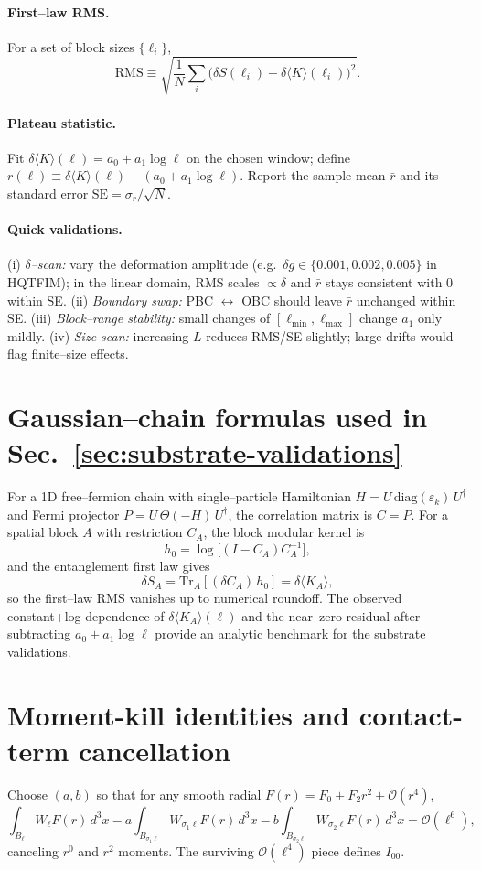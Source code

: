 \documentclass[aps,prd,onecolumn,superscriptaddress,nofootinbib]{revtex4-2}
\begin{document}
\paragraph*{First–law RMS.}
For a set of block sizes $\{\ell_i\}$,
\[
\mathrm{RMS} \equiv \sqrt{\frac{1}{N}\sum_i \big(\delta S(\ell_i)-\delta\!\langle K\rangle(\ell_i)\big)^2}.
\]
\paragraph*{Plateau statistic.}
Fit $\delta\!\langle K\rangle(\ell)=a_0+a_1\log\ell$ on the chosen window; define $r(\ell)\equiv\delta\!\langle K\rangle(\ell)-(a_0+a_1\log\ell)$. Report the sample mean $\bar r$ and its standard error $\mathrm{SE}=\sigma_r/\sqrt{N}$.
\paragraph*{Quick validations.}
(i) \emph{$\delta$–scan:} vary the deformation amplitude (e.g.\ $\delta g\in\{0.001,0.002,0.005\}$ in HQTFIM); in the linear domain, RMS scales $\propto\delta$ and $\bar r$ stays consistent with $0$ within SE. (ii) \emph{Boundary swap:} PBC $\leftrightarrow$ OBC should leave $\bar r$ unchanged within SE. (iii) \emph{Block–range stability:} small changes of $[\ell_{\min},\ell_{\max}]$ change $a_1$ only mildly. (iv) \emph{Size scan:} increasing $L$ reduces RMS/SE slightly; large drifts would flag finite–size effects.

\section{Gaussian–chain formulas used in Sec.~\ref{sec:substrate-validations}}
\label{app:gaussian-formulas}
For a 1D free–fermion chain with single–particle Hamiltonian $H=U\,\mathrm{diag}(\varepsilon_k)\,U^\dagger$ and Fermi projector $P=U\,\Theta(-H)\,U^\dagger$, the correlation matrix is $C=P$. For a spatial block $A$ with restriction $C_A$, the block modular kernel is
\[
h_0=\log\!\big[(I-C_A)C_A^{-1}\big],
\]
and the entanglement first law gives
\[
\delta S_A=\mathrm{Tr}_A\!\left[(\delta C_A)\,h_0\right]=\delta\!\langle K_A\rangle,
\]
so the first–law RMS vanishes up to numerical roundoff. The observed constant+log dependence of $\delta\!\langle K_A\rangle(\ell)$ and the near–zero residual after subtracting $a_0+a_1\log\ell$ provide an analytic benchmark for the substrate validations.

\section{Moment-kill identities and contact-term cancellation}
\label{app:MI-momentkill}
Choose $(a,b)$ so that for any smooth radial $F(r)=F_0+F_2 r^2+\mathcal O(r^4)$,
\begin{equation}
\int_{B_\ell}\!W_\ell F(r)\,d^3x - a\!\int_{B_{\sigma_1\ell}}\!W_{\sigma_1\ell}F(r)\,d^3x - b\!\int_{B_{\sigma_2\ell}}\!W_{\sigma_2\ell}F(r)\,d^3x = \mathcal O(\ell^6),
\end{equation}
canceling $r^0$ and $r^2$ moments. The surviving $\mathcal O(\ell^4)$ piece defines $I_{00}$.
\end{document}
